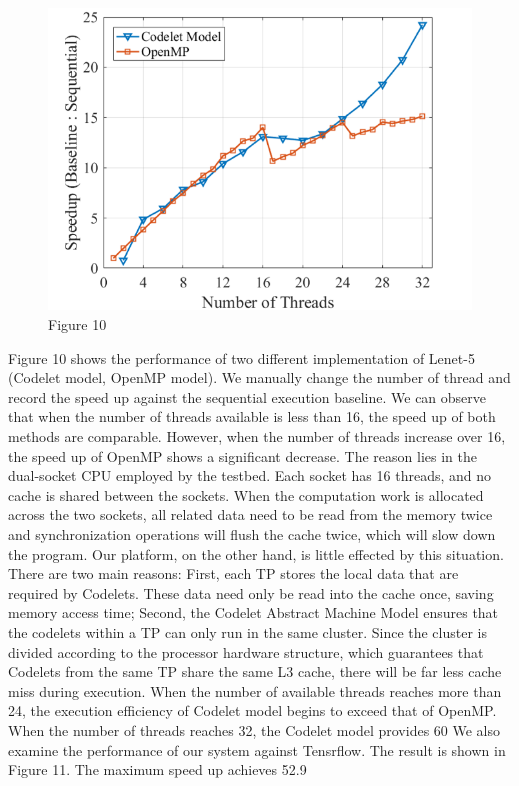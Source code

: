 \begin{figure}[h]
\caption{Figure 10}
\centering
\includegraphics[width=1\textwidth]{Fig/figure10.png}
\end{figure}
Figure 10 shows the performance of two different implementation of Lenet-5 (Codelet model, OpenMP model). We manually change the number of thread and record the speed up against the sequential execution baseline. 
We can observe that when the number of threads available is less than 16, the speed up of both methods are comparable. However, when the number of threads increase over 16, the speed up of OpenMP shows a significant decrease. The reason lies in the dual-socket CPU employed by the testbed. Each socket has 16 threads, and no cache is shared between the sockets. When the computation work is allocated across the two sockets, all related data need to be read from the memory twice and synchronization operations will flush the cache twice, which will slow down the program. Our platform, on the other hand, is little effected by this situation. There are two main reasons: First, each TP stores the local data that are required by Codelets. These data need only be read into the cache once, saving memory access time; Second, the Codelet Abstract Machine Model ensures that the codelets within a TP can only run in the same cluster. Since the cluster is divided according to the processor hardware structure, which guarantees that Codelets from the same TP share the same L3 cache, there will be far less cache miss during execution.
When the number of available threads reaches more than 24, the execution efficiency of Codelet model begins to exceed that of OpenMP. When the number of threads reaches 32, the Codelet model provides 60%
We also examine the performance of our system against Tensrflow. The result is shown in Figure 11. The maximum speed up achieves 52.9%
 
